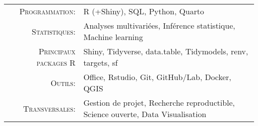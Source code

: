 \documentclass[localFont,alternative]{yaac-another-awesome-cv}
\begin{document}
\makecvheader

\renewcommand{\arraystretch}{1.1}

	\begin{tabular}{>{}r>{}p{13cm}}  
		\textsc{Programmation:}               	&   R (+Shiny), SQL, Python, Quarto \\
		\textsc{Statistiques:}  	 &   Analyses multivariées, Inférence statistique, Machine learning \\
		\textsc{Principaux packages R}              &   Shiny, Tidyverse, data.table, Tidymodels, renv, targets, sf  \\
		\textsc{Outils:}               	&  Office, Rstudio, Git, GitHub/Lab, Docker, QGIS \\ 
		\textsc{Transversales:}              &    Gestion de projet, Recherche reproductible, Science ouverte, Data Visualisation \\
	\end{tabular}
	
\end{document}
